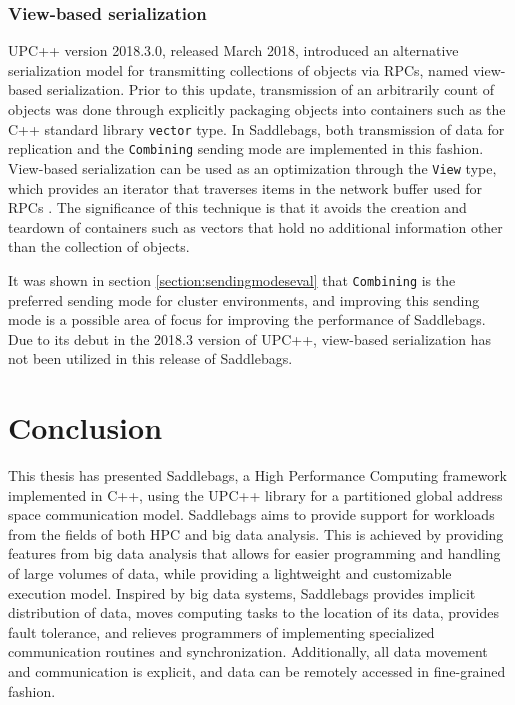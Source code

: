 \documentclass{uit-report}
\begin{document}
\subsection{View-based serialization}
UPC++ version 2018.3.0, released March 2018, introduced an alternative serialization model for transmitting collections of objects via RPCs, named view-based serialization. Prior to this update, transmission of an arbitrarily count of objects was done through explicitly packaging objects into containers such as the C++ standard library \texttt{vector} type. In Saddlebags, both transmission of data for replication and the \texttt{Combining} sending mode are implemented in this fashion. View-based serialization can be used as an optimization through the \texttt{View} type, which provides an iterator that traverses items in the network buffer used for RPCs \cite{upcxxguide20183}. The significance of this technique is that it avoids the creation and teardown of containers such as vectors that hold no additional information other than the collection of objects.

It was shown in section \ref{section:sendingmodeseval} that \texttt{Combining} is the preferred sending mode for cluster environments, and improving this sending mode is a possible area of focus for improving the performance of Saddlebags. Due to its debut in the 2018.3 version of UPC++, view-based serialization has not been utilized in this release of Saddlebags.





\chapter{Conclusion}
This thesis has presented Saddlebags, a High Performance Computing framework implemented in C++, using the UPC++ library for a partitioned global address space communication model. Saddlebags aims to provide support for workloads from the fields of both HPC and big data analysis. This is achieved by providing features from big data analysis that allows for easier programming and handling of large volumes of data, while providing a lightweight and customizable execution model. Inspired by big data systems, Saddlebags provides implicit distribution of data, moves computing tasks to the location of its data, provides fault tolerance, and relieves programmers of implementing specialized communication routines and synchronization. Additionally, all data movement and communication is explicit, and data can be remotely accessed in fine-grained fashion.
\end{document}
